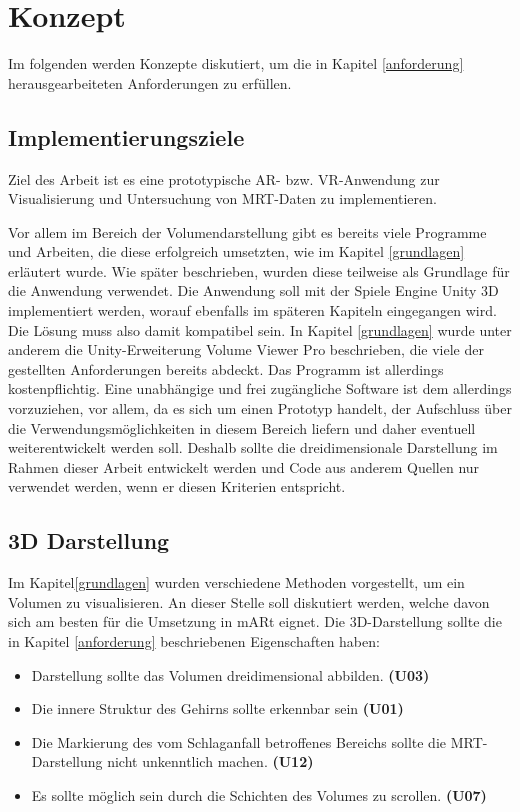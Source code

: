 
\chapter{Konzept}
\label{konzept}

Im folgenden werden Konzepte diskutiert, um die in Kapitel \ref{anforderung} herausgearbeiteten Anforderungen zu erfüllen.

\section{Implementierungsziele}
Ziel des Arbeit ist es eine prototypische AR- bzw. VR-Anwendung zur Visualisierung und Untersuchung von MRT-Daten zu implementieren. 

Vor allem im Bereich der Volumendarstellung gibt es bereits viele Programme und Arbeiten, die diese erfolgreich umsetzten, wie im Kapitel \ref{grundlagen} erläutert wurde.
Wie später beschrieben, wurden diese teilweise als Grundlage für die Anwendung verwendet. Die Anwendung soll mit der Spiele Engine Unity 3D implementiert werden, worauf ebenfalls im späteren Kapiteln eingegangen wird. Die Lösung muss also damit kompatibel sein. In Kapitel \ref{grundlagen} wurde unter anderem die Unity-Erweiterung Volume Viewer Pro beschrieben, die viele der gestellten Anforderungen bereits abdeckt. Das Programm ist allerdings kostenpflichtig. Eine unabhängige und frei zugängliche Software ist dem allerdings vorzuziehen, vor allem, da es sich um einen Prototyp handelt, der Aufschluss über die Verwendungsmöglichkeiten in diesem Bereich liefern und daher eventuell weiterentwickelt werden soll. Deshalb sollte die dreidimensionale Darstellung im Rahmen dieser Arbeit entwickelt werden und Code aus anderem Quellen nur verwendet werden, wenn er diesen Kriterien entspricht.

\section{3D Darstellung}

Im Kapitel\ref{grundlagen} wurden verschiedene Methoden vorgestellt, um ein Volumen zu visualisieren. An dieser Stelle soll diskutiert werden, welche davon sich am besten für die Umsetzung in mARt eignet.
Die 3D-Darstellung sollte die in Kapitel \ref{anforderung} beschriebenen Eigenschaften haben:

\begin{itemize}
\item Darstellung sollte das Volumen dreidimensional abbilden. \textbf{(U03)}
\item Die innere Struktur des Gehirns sollte erkennbar sein \textbf{(U01)}
\item Die Markierung des vom Schlaganfall betroffenes Bereichs sollte die MRT-Darstellung nicht unkenntlich machen. \textbf{(U12)}
\item Es sollte möglich sein durch die Schichten des Volumes zu scrollen. \textbf{(U07)}
\end{itemize}

